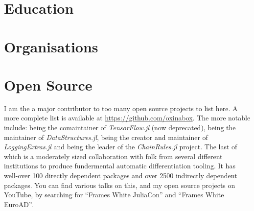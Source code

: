 \documentclass[11pt,a4paper,sans]{moderncv}
\begin{document}
\section{Education}

\section{Organisations}

\section{Open Source}
I am the a major contributor to too many open source projects to list here.
A more complete list is available at \url{https://github.com/oxinabox}.
The more notable include: being the comaintainer of \emph{TensorFlow.jl} (now deprecated),
being the maintainer of \emph{DataStructures.jl}, being the creator and maintainer of \emph{LoggingExtras.jl} 
and being the leader of the \emph{ChainRules.jl} project.
The last of which is a moderately sized collaboration with folk from several different institutions to produce fundermental automatic differentiation tooling.
It has well-over 100 directly dependent packages and over 2500 indirectly dependent packages.
You can find various talks on this, and my open source projects on YouTube, by searching for ``Frames White JuliaCon'' and ``Frames White EuroAD''.



\clearpage
\sethintscolumntowidth{[1234]}
\small
\nocite{*}

 
\end{document}
